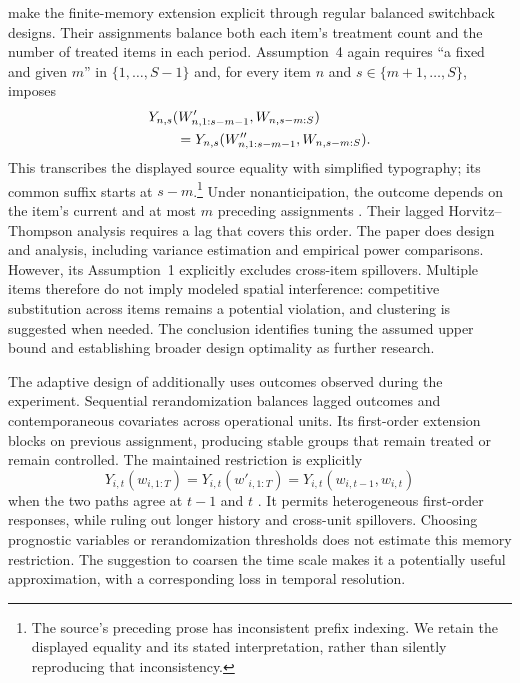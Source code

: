 \citet{missault2025} make the finite-memory extension explicit through regular balanced switchback designs. Their assignments balance both each item's treatment count and the number of treated items in each period. Assumption~4 again requires ``a fixed and given $m$'' in $\{1,\ldots,S-1\}$ and, for every item $n$ and $s\in\{m+1,\ldots,S\}$, imposes
\begin{align}
 &Y_{n,s}(W'_{n,1:s-m-1},W_{n,s-m:S})\notag\\
 &\qquad=Y_{n,s}(W''_{n,1:s-m-1},W_{n,s-m:S}).
 \label{eq:missault-finite-memory}
\end{align}
This transcribes the displayed source equality with simplified typography; its common suffix starts at $s-m$.\footnote{The source's preceding prose has inconsistent prefix indexing. We retain the displayed equality and its stated interpretation, rather than silently reproducing that inconsistency.} Under nonanticipation, the outcome depends on the item's current and at most $m$ preceding assignments \citep[Assumption~4, p.~6]{missault2025}. Their lagged Horvitz--Thompson analysis requires a lag that covers this order. The paper does design and analysis, including variance estimation and empirical power comparisons. However, its Assumption~1 explicitly excludes cross-item spillovers. Multiple items therefore do not imply modeled spatial interference: competitive substitution across items remains a potential violation, and clustering is suggested when needed. The conclusion identifies tuning the assumed upper bound and establishing broader design optimality as further research.

The adaptive design of \citet{zeng2026} additionally uses outcomes observed during the experiment. Sequential rerandomization balances lagged outcomes and contemporaneous covariates across operational units. Its first-order extension blocks on previous assignment, producing stable groups that remain treated or remain controlled. The maintained restriction is explicitly
\begin{equation}\label{eq:zeng-first-order}
Y_{i,t}(w_{i,1:T})=Y_{i,t}(w'_{i,1:T})
=Y_{i,t}(w_{i,t-1},w_{i,t})
\end{equation}
when the two paths agree at $t-1$ and $t$ \citep[Assumption~3(b), pp.~4--5]{zeng2026}. It permits heterogeneous first-order responses, while ruling out longer history and cross-unit spillovers. Choosing prognostic variables or rerandomization thresholds does not estimate this memory restriction. The suggestion to coarsen the time scale makes it a potentially useful approximation, with a corresponding loss in temporal resolution.


